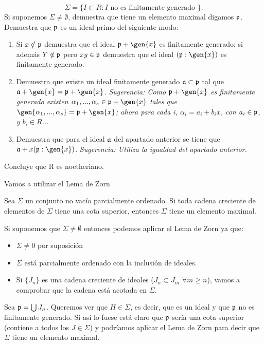 \begin{problem}[1]
	$$\Sigma = \{ I \subset R: I \text{ no es finitamente generado } \}.$$
	\ppart Si suponemos $\Sigma \neq \emptyset$, demuestra que tiene un elemento maximal digamos $\mathfrak{p}$.
	\ppart Demuestra que $\mathfrak{p}$ es un ideal primo del siguiente modo:
	\begin{enumerate}
		\item Si $x \notin \mathfrak{p}$ demuestra que el ideal $\pideal+\gen{x}$ es finitamente generado; si además $Y \notin \mathfrak{p}$ pero $xy \in \mathfrak{p}$ demuestra que el ideal $(\pideal: \gen{x})$ es finitamente generado.
		\item Demuestra que existe un ideal finitamente generado $\mathfrak{a} \subset \mathfrak{p}$ tal que $\aideal + \gen{x}=\pideal + \gen{x}$. \textit{Sugerencia: Como $\pideal+\gen{x}$ es finitamente generado existen $\alpha_1,...,\alpha_s \in \pideal + \gen{x}$ tales que $\gen{\alpha_1,...,\alpha_s}=\pideal + \gen{x}$; ahora para cada i, $\alpha_i=a_i+b_ix$, con $a_i \in \mathfrak{p}$, y $b_i \in R$...}
		\item Demuestra que para el ideal $\mathfrak{a}$ del apartado anterior se tiene que $\aideal+x(\pideal:\gen{x})$. \textit{Sugerencia: Utiliza la igualdad del apartado
			anterior.}
	\end{enumerate}
	\ppart Concluye que R es noetheriano.

	\solution

	\spart

	Vamos a utilizar el Lema de Zorn
	\begin{lemma}
		Sea $\Sigma$ un conjunto no vacío parcialmente ordenado. Si toda cadena creciente de elementos de $\Sigma$ tiene una cota superior, entonces $\Sigma$ tiene un elemento maximal.
	\end{lemma}

	Si suponemos que $\Sigma \neq \emptyset$ entonces podemos aplicar el Lema de Zorn ya que:
	\begin{itemize}
		\item $\Sigma \neq 0$ por suposición
		\item $\Sigma$ está parcialmente ordenado con la inclusión de ideales.
		\item Si $\{ J_n\}$ es una cadena creciente de ideales ($J_n \subset J_m$ $\forall m\geq n$), vamos a comprobar que la cadena está acotada en $\Sigma$.
	\end{itemize}
	Sea $\mathfrak{p} = \bigcup J_n$. Queremos ver que $H \in \Sigma$, es decir, que es un ideal y que $\mathfrak{p}$ no es finitamente generado.
	Si así lo fuese está claro que $\mathfrak{p}$ sería una cota superior (contiene a todos los $J \in \Sigma$) y podríamos aplicar el Lema de Zorn para decir que $\Sigma$ tiene un elemento maximal.


\end{problem}

